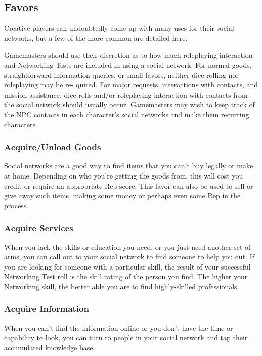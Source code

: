 \subsection{Favors}

Creative players can undoubtedly come up with many 
uses for their social networks, but a few of the more 
common are detailed here.

Gamemasters should use their discretion as to how 
much roleplaying interaction and Networking Tests 
are included in using a social network. For normal 
goods, straightforward information queries, or small 
favors, neither dice rolling nor roleplaying may be re-
quired. For major requests, interactions with contacts, 
and mission assistance, dice rolls and/or roleplaying 
interaction with contacts from the social network 
should usually occur. Gamemasters may wish to keep 
track of the NPC contacts in each character's social 
networks and make them recurring characters.

\subsubsection{Acquire/Unload Goods}

Social networks are a good way to find items that 
you can't buy legally or make at home. Depending 
on who you're getting the goods from, this will cost 
you credit or require an appropriate Rep score. This 
favor can also be used to sell or give away such items, 
making some money or perhaps even some Rep in 
the process.

\subsubsection{Acquire Services}

When you lack the skills or education you need, or 
you just need another set of arms, you can call out 
to your social network to find someone to help you 
out. If you are looking for someone with a particular 
skill, the result of your successful Networking Test roll 
is the skill rating of the person you find. The higher 
your Networking skill, the better able you are to find 
highly-skilled professionals.

\subsubsection{Acquire Information}

When you can't find the information online or you 
don't have the time or capability to look, you can 
turn to people in your social network and tap their 
accumulated knowledge base.

